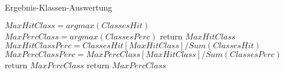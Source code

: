         \begin{algorithm}
            \caption{Ergebnis-Klassen-Auswertung}
            \begin{algorithmic}[1]
                \State {}
                \State
                \State $MaxHitClass = argmax(ClassesHit)$
                \State $MaxPercClass = argmax(ClassesPerc)$
                \State
                    \State return $MaxHitClass$
                \Else
                    \State
                    \State $MaxHitClassPerc = ClassesHit[MaxHitClass] / Sum(ClassesHit) $
                    \State $MaxPercClassPerc = MaxPercClass[MaxHitClass] / Sum(ClassesPerc) $
                    \State
                        \State return $MaxPercClass$
                    \Else
                        \State return $MaxPercClass$
                    \EndIf
                \EndIf
            \EndFunction
            \end{algorithmic}
        \end{algorithm}